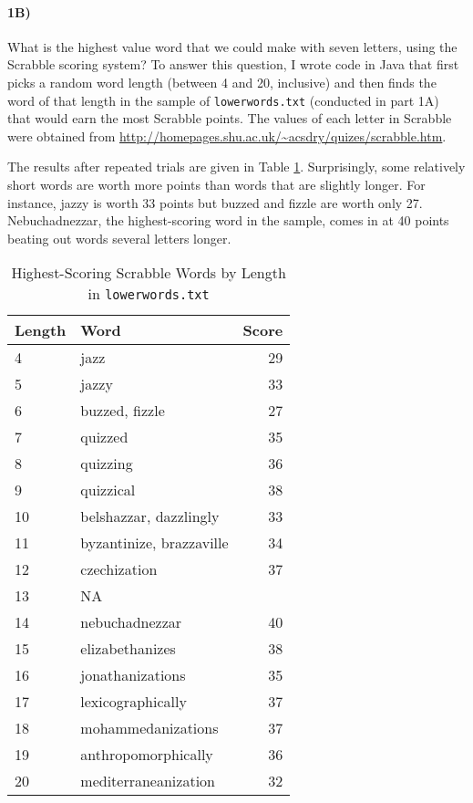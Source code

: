 \documentclass[12pt]{article}
\begin{document}
\paragraph{1B)} What is the highest value word that we could make with seven letters, using the Scrabble scoring system? To answer this question, I wrote code in Java that first picks a random word length (between 4 and 20, inclusive) and then finds the word of that length in the sample of \texttt{lowerwords.txt} (conducted in part 1A) that would earn the most Scrabble points. The values of each letter in Scrabble were obtained from \url{http://homepages.shu.ac.uk/~acsdry/quizes/scrabble.htm}. 

The results after repeated trials are given in Table \ref{table1b}. Surprisingly, some relatively short words are worth more points than words that are slightly longer. For instance, jazzy is worth 33 points but buzzed and fizzle are worth only 27. Nebuchadnezzar, the highest-scoring word in the sample, comes in at 40 points beating out words several letters longer. 

\begin{table}[h]
\begin{center}
\caption{Highest-Scoring Scrabble Words by Length in \texttt{lowerwords.txt}} 
\label{table1b}
\begin{tabular}{llr}
\toprule 
Length & Word & Score \\
\midrule 
4 & jazz & 29 \\
5 & jazzy & 33 \\
6 & buzzed, fizzle & 27 \\ 
7 & quizzed & 35 \\
8 & quizzing & 36 \\
9 & quizzical & 38 \\
10 & belshazzar, dazzlingly & 33  \\
11 & byzantinize, brazzaville & 34 \\
12 & czechization & 37 \\
13 & NA \\
14 & nebuchadnezzar & 40 \\
15 & elizabethanizes & 38 \\
16 & jonathanizations & 35 \\
17 & lexicographically & 37 \\
18 & mohammedanizations & 37 \\
19 & anthropomorphically & 36 \\
20 &  mediterraneanization & 32 \\
\bottomrule
\end{tabular}
\end{center}
\end{table}
\end{document}
